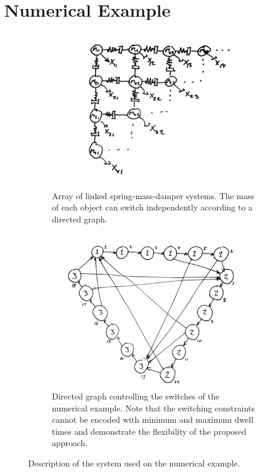 \section{Numerical Example}
\begin{figure}
	\centering
	\begin{subfigure}[t]{0.475\columnwidth}
		\centering
		\includegraphics[width=\textwidth]{./figures/num_ex_sys}
		\caption{Array of linked spring-mass-damper systems. The mass of each object can switch independently according to a directed graph.}
		\label{fig:num_ex_sys}
	\end{subfigure}
	\hfill
	\begin{subfigure}[t]{0.475\columnwidth}
		\centering
		\includegraphics[width=\textwidth]{./figures/num_ex_graph}
		\caption{Directed graph controlling the switches of the numerical example. Note that the switching constraints cannot be encoded with minimum and maximum dwell times and demonstrate the flexibility of the proposed approach.}
		\label{fig:num_ex_graph}
	\end{subfigure}
	\caption{Description of the system used on the numerical example.}
\end{figure}

